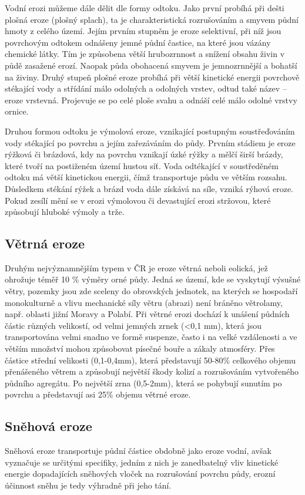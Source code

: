 Vodní erozi můžeme dále dělit dle formy odtoku. Jako první probíhá při dešti plošná eroze (plošný splach), ta je charakteristická rozrušováním a smyvem půdní hmoty z celého území. Jejím prvním stupněm je eroze selektivní, při níž jsou povrchovým odtokem odnášeny jemné půdní častice, na které jsou vázány chemické látky. Tím je způsobena větší hrubozrnnost a snížení obsahu živin v půdě zasažené erozí. Naopak půda obohacená smyvem je jemnozrnnější a bohatší na živiny. Druhý stupeň plošné eroze probíhá při větší kinetické energii povrchově stékající vody a střídání málo odolných a odolných vrstev, odtud také název – eroze vrstevná. Projevuje se po celé ploše svahu a odnáší celé málo odolné vrstvy ornice.

Druhou formou odtoku je výmolová eroze, vznikající postupným soustřeďováním vody stékající po povrchu a jejím zařezáváním do půdy. Prvním stádiem je eroze rýžková či brázdová, kdy na povrchu vznikají úzké rýžky a mělčí širší brázdy, které tvoří na postiženém území hustou síť. Voda odtékající v soustředěném odtoku má větší kinetickou energii, čímž transportuje půdu ve větším rozsahu. Důsledkem stékání rýžek a brázd voda dále získává na síle, vzniká rýhová eroze. Pokud zesílí mění se v erozi výmolovou či devastující erozi stržovou, které způsobují hluboké výmoly a trže.
\subsection{Větrná eroze}
Druhým nejvýznamnějším typem v ČR je eroze větrná neboli eolická, jež ohrožuje téměř 10 \% výměry orné půdy. Jedná se území, kde se vyskytují výsušné větry, pozemky jsou zde sceleny do obrovských jednotek, na kterých se hospodaří monokulturně a vlivu mechanické síly větru (abrazi) není bráněno větrolamy, např. oblasti jižní Moravy a Polabí. Při větrné erozi dochází k unášení půdních částic různých velikostí, od velmi jemných zrnek (<0,1 mm), která jsou transportována velmi snadno ve formě suspenze, často i na velké vzdálenosti a ve větším množství mohou způsobovat písečné bouře a zákaly atmosféry. Přes částice střední velikosti (0,1-0,4mm), která představují 50-80\% celkového objemu přenášeného větrem a způsobují největší škody kolizí a rozrušováním vytvořeného půdního agregátu. Po největší zrna (0,5-2mm), která se pohybují sunutím po povrchu a představují asi 25\% objemu větrné eroze.

\subsection{Sněhová eroze}
Sněhová eroze transportuje půdní částice obdobně jako eroze vodní, avšak vyznačuje se určitými specifiky, jedním z nich je zanedbatelný vliv kinetické energie dopadajících sněhových vloček na rozrušování povrchu půdy, erozní účinnost sněhu je tedy výhradně při jeho tání. 


